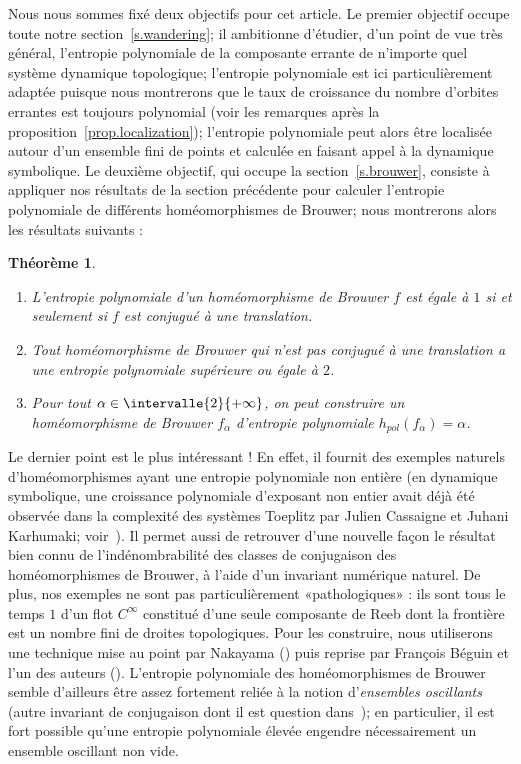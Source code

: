 \documentclass[11pt]{article}
\newtheorem{theo}{Théorème}[section]
\providecommand{\og}{«\nobreakspace}
\providecommand{\fg}{\nobreakspace»}
\theoremstyle{definition}
\newcommand{\pointir}{.\ ---\ }
\numberwithin{equation}{section}
\numberwithin{figure}{section}
\numberwithin{table}{section}
\newenvironment{theoc}{\let\pointir\relax \begin{theo}}{\end{theo}}
\begin{document}
Nous nous sommes fixé deux objectifs pour cet article. Le premier objectif occupe toute notre section~\ref{s.wandering}; il ambitionne d'étudier, d'un point de vue très général, l'entropie polynomiale de la composante errante de n'importe quel système dynamique topologique; l'entropie polynomiale est ici particulièrement adaptée puisque nous montrerons que le taux de croissance du nombre d'orbites errantes est toujours polynomial (voir les remarques après la proposition~\ref{prop.localization}); l'entropie polynomiale peut alors être localisée autour d'un ensemble fini de points et calculée en faisant appel à la dynamique symbolique. Le deuxième objectif, qui occupe la section~\ref{s.brouwer}, consiste à appliquer nos résultats de la section précédente pour calculer l'entropie polynomiale de différents homéomorphismes de Brouwer; nous montrerons alors les résultats suivants :

\begin{theoc}\ \label{theo}
\begin{enumerate}%
\item \label{1.1.1} L'entropie polynomiale d'un homéomorphisme de Brouwer $f$ est égale à $1$ si et seulement si $f$ est conjugué à une translation.

\item \label{1.1.2} Tout homéomorphisme de Brouwer qui n'est pas conjugué à une translation a une entropie polynomiale supérieure ou égale à $2$.

\item \label{1.1.3} Pour tout $\alpha \in \intervalle{2}{+\infty}$, on peut construire un homéomorphisme de Brouwer $f_{\alpha}$ d'entropie polynomiale $h_{pol}(f_{\alpha}) =\alpha$.
\end{enumerate}
\end{theoc}

Le dernier point est le plus intéressant ! En effet, il fournit des exemples naturels d'homéomorphismes ayant une entropie polynomiale non entière (en dynamique symbolique, une croissance polynomiale d'exposant non entier avait déjà été observée dans la complexité des systèmes Toeplitz par Julien Cassaigne et Juhani Karhumaki; voir~\cite[section~5]{CasKar97}). Il permet aussi de retrouver d'une nouvelle façon le résultat bien connu de l'indénombrabilité des classes de conjugaison des homéomorphismes de Brouwer, à l'aide d'un invariant numérique naturel. De plus, nos exemples ne sont pas particulièrement \og pathologiques\fg{} : ils sont tous le temps $1$ d'un flot $C^\infty$ constitué d'une seule composante de Reeb dont la frontière est un nombre fini de droites topologiques. Pour les construire, nous utiliserons une technique mise au point par Nakayama (\cite{Nak95}) puis reprise par François Béguin et l'un des auteurs (\cite{BegLer03}). L'entropie polynomiale des homéomorphismes de Brouwer semble d'ailleurs être assez fortement reliée à la notion d'\emph{ensembles oscillants} (autre invariant de conjugaison dont il est question dans~\cite{BegLer03}); en particulier, il est fort possible qu'une entropie polynomiale élevée engendre nécessairement un ensemble oscillant non vide.
\end{document}
